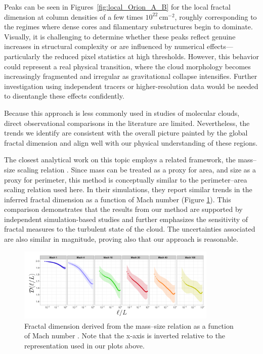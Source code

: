 Peaks can be seen in Figures~\ref{fig:local_Orion_A_B} for the local fractal dimension at column densities of a few times \(10^{22}\,\mathrm{cm}^{-2}\), roughly corresponding to the regimes where dense cores and filamentary substructures begin to dominate. Visually, it is challenging to determine whether these peaks reflect genuine increases in structural complexity or are influenced by numerical effects—particularly the reduced pixel statistics at high thresholds. However, this behavior could represent a real physical transition, where the cloud morphology becomes increasingly fragmented and irregular as gravitational collapse intensifies. Further investigation using independent tracers or higher-resolution data would be needed to disentangle these effects confidently.

Because this approach is less commonly used in studies of molecular clouds, direct observational comparisons in the literature are limited.  
Nevertheless, the trends we identify are consistent with the overall picture painted by the global fractal dimension and align well with our physical understanding of these regions.

The closest analytical work on this topic employs a related framework, the mass–size scaling relation \cite{beattie2019relation}.  
Since mass can be treated as a proxy for area, and size as a proxy for perimeter, this method is conceptually similar to the perimeter–area scaling relation used here.  
In their simulations, they report similar trends in the inferred fractal dimension as a function of Mach number (Figure \ref{fig:beattie_fractal_dimension}).
This comparison demonstrates that the results from our method are supported by independent simulation-based studies and further emphasizes the sensitivity of fractal measures to the turbulent state of the cloud. The uncertainties associated are also similar in magnitude, proving also that our approach is reasonable.

\begin{figure}[t]
    \centering
    \includegraphics[width=0.85\textwidth]{figures/beattie_fractal_dimension.png}
    \caption{Fractal dimension derived from the mass–size relation as a function of Mach number \cite{beattie2019relation}.  
    Note that the x-axis is inverted relative to the representation used in our plots above.}
    \label{fig:beattie_fractal_dimension}
\end{figure}

